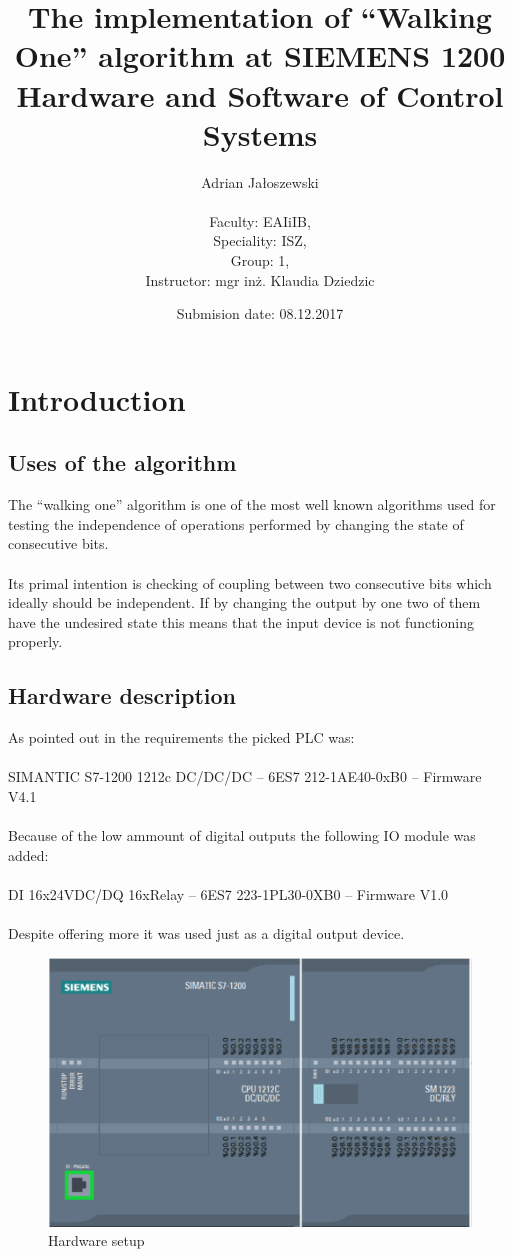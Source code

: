 \documentclass[a4paper, 12pt, titlepage]{article}
\title{The implementation of ``Walking One'' algorithm at SIEMENS 1200 \\
Hardware and Software of Control Systems}
\author{Adrian Jałoszewski \\ \\
    Faculty: EAIiIB, \\
    Speciality: ISZ, \\
    Group: 1, \\
    Instructor: mgr inż. Klaudia Dziedzic}
\date{Submision date: 08.12.2017}
\begin{document}
    \maketitle
    \tableofcontents 
    \newpage
    \section{Introduction}
        \subsection{Uses of the algorithm}
            The ``walking one'' algorithm is one of the most well known
            algorithms used for testing the independence of operations
            performed by changing the state of consecutive bits.
            \\ \\
            Its primal intention is checking of coupling between two 
            consecutive bits which ideally should be independent. If by
            changing the output by one two of them have the undesired 
            state this means that the input device is not functioning 
            properly.
        \subsection{Hardware description}
            As pointed out in the requirements the picked PLC was: \\ \\
            SIMANTIC S7-1200 1212c DC/DC/DC -- 6ES7 212-1AE40-0xB0 -- Firmware V4.1 
            \\ \\
            Because of the low ammount of digital outputs the following IO module was
            added: \\ \\
            DI 16x24VDC/DQ 16xRelay -- 6ES7 223-1PL30-0XB0 -- Firmware V1.0 \\ \\
            Despite offering more it was used just as a digital output device.
            \begin{figure}[H]
                \centering
                \includegraphics[width=0.9\linewidth]{plc.png}
                \caption{Hardware setup}
            \end{figure}
\end{document}
